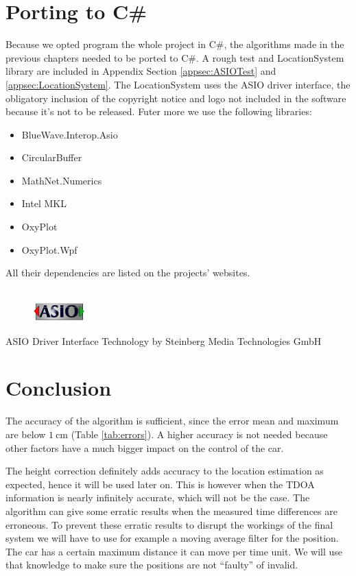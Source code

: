 \documentclass[final]{scrreprt} %
\begin{document}
\section{Porting to C\#}
Because we opted program the whole project in C\#, the algorithms made in the previous chapters needed to be ported to C\#. A rough test and LocationSystem library are included in Appendix Section \ref{appsec:ASIOTest} and \ref{appsec:LocationSystem}. The LocationSystem uses the ASIO driver interface, the obligatory inclusion of the copyright notice and logo not included in the software because it's not to be released.  Futer more we use the following libraries:
\begin{itemize}
\item BlueWave.Interop.Asio
\item CircularBuffer
\item MathNet.Numerics
\item Intel MKL
\item OxyPlot
\item OxyPlot.Wpf
\end{itemize}
All their dependencies are listed on the projects' websites.
\\ \\
\begin{figure}[h]
	\includegraphics[width=2cm]{resources/ASIO_LOGO1.jpg}
\end{figure}
ASIO Driver Interface Technology by Steinberg Media Technologies GmbH

\section{Conclusion}
The accuracy of the algorithm is sufficient, since the error mean and maximum are below $\SI{1}{\centi\meter}$ (Table \ref{tab:errors}).
A higher accuracy is not needed because other factors have a much bigger impact on the control of the car.

The height correction definitely adds accuracy to the location estimation as expected, hence it will be used later on.
This is however when the TDOA information is nearly infinitely accurate, which will not be the case.
The algorithm can give some erratic results when the measured time differences are erroneous.
To prevent these erratic results to disrupt the workings of the final system we will have to use for example a moving average filter for the position.
The car has a certain maximum distance it can move per time unit. We will use that knowledge to make sure the positions are not ``faulty'' of invalid.
\end{document}
